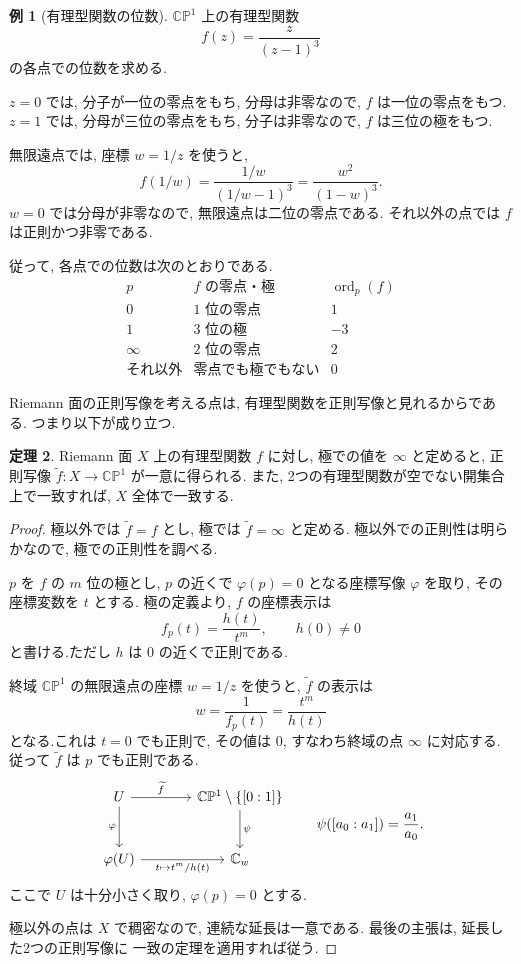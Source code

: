 \documentclass[dvipdfmx,a4paper,11pt]{article} %
\newcommand{\C}{\mathbb{C}}
\theoremstyle{definition}
\newtheorem{thm}{定理}[section]
\numberwithin{equation}{section}
\newtheorem{exa}[thm]{例}
\begin{document}
\begin{exa}[有理型関数の位数]
$\C\mathbb P^1$ 上の有理型関数
\[
f(z)=\frac{z}{(z-1)^3}
\]
の各点での位数を求める.

$z=0$ では, 分子が一位の零点をもち, 分母は非零なので,
$f$ は一位の零点をもつ.
$z=1$ では, 分母が三位の零点をもち, 分子は非零なので,
$f$ は三位の極をもつ.

無限遠点では, 座標 $w=1/z$ を使うと,
\[
f(1/w)=\frac{1/w}{(1/w-1)^3}
=\frac{w^2}{(1-w)^3}.
\]
$w=0$ では分母が非零なので, 無限遠点は二位の零点である.
それ以外の点では $f$ は正則かつ非零である.

従って, 各点での位数は次のとおりである.
\[
\begin{array}{c|c|c}
p&f\text{ の零点・極}&\operatorname{ord}_p(f)\\ \hline
0&1\text{ 位の零点}&1\\
1&3\text{ 位の極}&-3\\
\infty&2\text{ 位の零点}&2\\
\text{それ以外}&\text{零点でも極でもない}&0
\end{array}
\]
\end{exa}



Riemann 面の正則写像を考える点は, 有理型関数を正則写像と見れるからである. つまり以下が成り立つ. 
\begin{thm}\label{O-M057}
Riemann 面 $X$ 上の有理型関数 $f$ に対し, 
極での値を $\infty$ と定めると, 正則写像
$\widetilde f:X\to\C\mathbb P^1$ が一意に得られる.
また, 2つの有理型関数が空でない開集合上で一致すれば, 
$X$ 全体で一致する.
\end{thm}

\begin{proof}
極以外では $\widetilde f=f$ とし, 極では $\widetilde f=\infty$ と定める.
極以外での正則性は明らかなので, 極での正則性を調べる.

$p$ を $f$ の $m$ 位の極とし, 
$p$ の近くで $\varphi(p)=0$ となる座標写像 $\varphi$ を取り, その座標変数を $t$ とする.
極の定義より, $f$ の座標表示は
\[
f_p(t)=\frac{h(t)}{t^m},\qquad h(0)\neq0
\]
と書ける.ただし $h$ は $0$ の近くで正則である.

終域 $\C\mathbb P^1$ の無限遠点の座標 $w=1/z$ を使うと, 
$\widetilde f$ の表示は
\[
w=\frac{1}{f_p(t)}=\frac{t^m}{h(t)}
\]
となる.これは $t=0$ でも正則で, その値は $0$, 
すなわち終域の点 $\infty$ に対応する.
従って $\widetilde f$ は $p$ でも正則である.
\[
\begin{tikzcd}[column sep=large,row sep=large]
U \arrow[r,"\widetilde f"] \arrow[d,"\varphi"'] &
\C\mathbb P^1\setminus\{[0:1]\} \arrow[d,"\psi"]\\
\varphi(U) \arrow[r,"t\mapsto t^m/h(t)"'] & \C_w
\end{tikzcd}
\qquad
\psi([a_0:a_1])=\frac{a_1}{a_0}.
\]
ここで $U$ は十分小さく取り, $\varphi(p)=0$ とする.

極以外の点は $X$ で稠密なので, 連続な延長は一意である.
最後の主張は, 延長した2つの正則写像に
一致の定理を適用すれば従う.
\end{proof}
\end{document}
